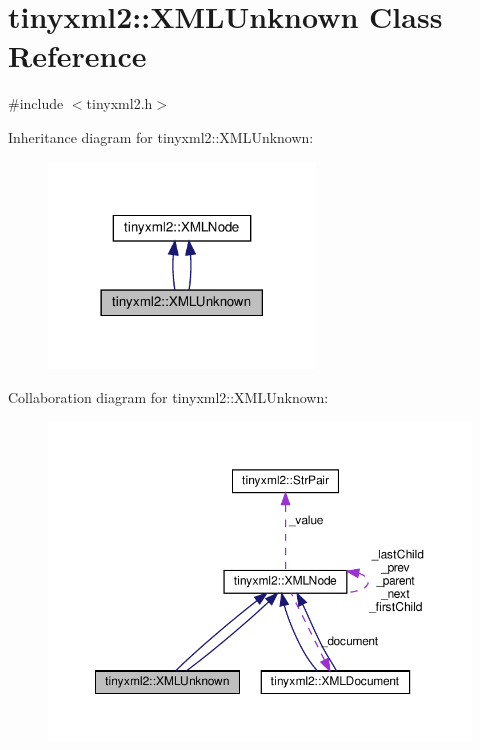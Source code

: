 \hypertarget{classtinyxml2_1_1XMLUnknown}{}\section{tinyxml2\+:\+:X\+M\+L\+Unknown Class Reference}
\label{classtinyxml2_1_1XMLUnknown}


{\ttfamily \#include $<$tinyxml2.\+h$>$}



Inheritance diagram for tinyxml2\+:\+:X\+M\+L\+Unknown\+:
\nopagebreak
\begin{figure}[H]
\begin{center}
\leavevmode
\includegraphics[width=201pt]{classtinyxml2_1_1XMLUnknown__inherit__graph}
\end{center}
\end{figure}


Collaboration diagram for tinyxml2\+:\+:X\+M\+L\+Unknown\+:
\nopagebreak
\begin{figure}[H]
\begin{center}
\leavevmode
\includegraphics[width=350pt]{classtinyxml2_1_1XMLUnknown__coll__graph}
\end{center}
\end{figure}
